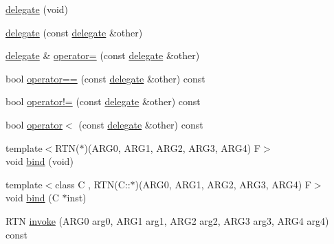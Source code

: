 \begin{DoxyCompactItemize}
\item 
\hyperlink{classcrap_1_1delegate_3_01_r_t_n_07_a_r_g0_00_01_a_r_g1_00_01_a_r_g2_00_01_a_r_g3_00_01_a_r_g4_08_4_a020f1ae4148520d946c6642a2e4f691b}{delegate} (void)
\item 
\hyperlink{classcrap_1_1delegate_3_01_r_t_n_07_a_r_g0_00_01_a_r_g1_00_01_a_r_g2_00_01_a_r_g3_00_01_a_r_g4_08_4_a6fef30ad579b299274ad6fee83fd9846}{delegate} (const \hyperlink{classcrap_1_1delegate}{delegate} \&other)
\item 
\hyperlink{classcrap_1_1delegate}{delegate} \& \hyperlink{classcrap_1_1delegate_3_01_r_t_n_07_a_r_g0_00_01_a_r_g1_00_01_a_r_g2_00_01_a_r_g3_00_01_a_r_g4_08_4_a141e1bfd2472f019b88c957412e77872}{operator=} (const \hyperlink{classcrap_1_1delegate}{delegate} \&other)
\item 
bool \hyperlink{classcrap_1_1delegate_3_01_r_t_n_07_a_r_g0_00_01_a_r_g1_00_01_a_r_g2_00_01_a_r_g3_00_01_a_r_g4_08_4_ac5c7adec22b3d08a94ec819556fa6b5f}{operator==} (const \hyperlink{classcrap_1_1delegate}{delegate} \&other) const 
\item 
bool \hyperlink{classcrap_1_1delegate_3_01_r_t_n_07_a_r_g0_00_01_a_r_g1_00_01_a_r_g2_00_01_a_r_g3_00_01_a_r_g4_08_4_aad776e05d9435e1847ec7f7ca5ca3471}{operator!=} (const \hyperlink{classcrap_1_1delegate}{delegate} \&other) const 
\item 
bool \hyperlink{classcrap_1_1delegate_3_01_r_t_n_07_a_r_g0_00_01_a_r_g1_00_01_a_r_g2_00_01_a_r_g3_00_01_a_r_g4_08_4_ab03730df016137180f6dd65d07d23de2}{operator$<$} (const \hyperlink{classcrap_1_1delegate}{delegate} \&other) const 
\item 
{\footnotesize template$<$R\+T\+N($\ast$)(\+A\+R\+G0, A\+R\+G1, A\+R\+G2, A\+R\+G3, A\+R\+G4) F$>$ }\\void \hyperlink{classcrap_1_1delegate_3_01_r_t_n_07_a_r_g0_00_01_a_r_g1_00_01_a_r_g2_00_01_a_r_g3_00_01_a_r_g4_08_4_a70c860dd0cb7e5d2d68030b0b68e64ee}{bind} (void)
\item 
{\footnotesize template$<$class C , R\+T\+N(\+C\+::$\ast$)(\+A\+R\+G0, A\+R\+G1, A\+R\+G2, A\+R\+G3, A\+R\+G4) F$>$ }\\void \hyperlink{classcrap_1_1delegate_3_01_r_t_n_07_a_r_g0_00_01_a_r_g1_00_01_a_r_g2_00_01_a_r_g3_00_01_a_r_g4_08_4_a55e944a563058504872fd920106c1de4}{bind} (C $\ast$inst)
\item 
R\+T\+N \hyperlink{classcrap_1_1delegate_3_01_r_t_n_07_a_r_g0_00_01_a_r_g1_00_01_a_r_g2_00_01_a_r_g3_00_01_a_r_g4_08_4_a82cd0e7f8cdd9e243fd38891b01b9392}{invoke} (A\+R\+G0 arg0, A\+R\+G1 arg1, A\+R\+G2 arg2, A\+R\+G3 arg3, A\+R\+G4 arg4) const 
\end{DoxyCompactItemize}


